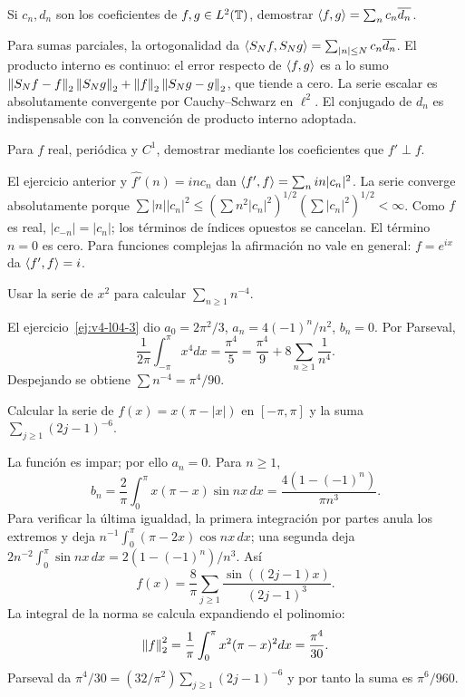 \begin{ejercicio}\label{ej:v4-l06-2}
Si $c_n,d_n$ son los coeficientes de $f,g\in L^2(\mathbb T)$, demostrar $\left\langle f,g\right\rangle=\sum_n c_n\overline{d_n}$.
\end{ejercicio}
\begin{solucion}
Para sumas parciales, la ortogonalidad da $\left\langle S_Nf,S_Ng\right\rangle=\sum_{|n|\leq N}c_n\overline{d_n}$. El producto interno es continuo: el error respecto de $\left\langle f,g\right\rangle$ es a lo sumo $\left\lVert S_Nf-f\right\rVert_2\left\lVert S_Ng\right\rVert_2+\left\lVert f\right\rVert_2\left\lVert S_Ng-g\right\rVert_2$, que tiende a cero. La serie escalar es absolutamente convergente por Cauchy--Schwarz en $\ell^2$. El conjugado de $d_n$ es indispensable con la convención de producto interno adoptada.
\end{solucion}

\begin{ejercicio}\label{ej:v4-l06-3}
Para $f$ real, periódica y $C^1$, demostrar mediante los coeficientes que $f'\perp f$.
\end{ejercicio}
\begin{solucion}
El ejercicio anterior y $\widehat{f'}(n)=inc_n$ dan $\left\langle f',f\right\rangle=\sum_n in|c_n|^2$. La serie converge absolutamente porque $\sum|n||c_n|^2\leq(\sum n^2|c_n|^2)^{1/2}(\sum|c_n|^2)^{1/2}<\infty$. Como $f$ es real, $|c_{-n}|=|c_n|$; los términos de índices opuestos se cancelan. El término $n=0$ es cero. Para funciones complejas la afirmación no vale en general: $f=e^{ix}$ da $\left\langle f',f\right\rangle=i$.
\end{solucion}

\begin{ejercicio}\label{ej:v4-l06-4}
Usar la serie de $x^2$ para calcular $\sum_{n\geq1}n^{-4}$.
\end{ejercicio}
\begin{solucion}
El ejercicio~\ref{ej:v4-l04-3} dio $a_0=2\pi^2/3$, $a_n=4(-1)^n/n^2$, $b_n=0$. Por Parseval,
\[
 \frac1{2\pi}\int_{-\pi}^\pi x^4dx
 =\frac{\pi^4}5=\frac{\pi^4}9+8\sum_{n\geq1}\frac1{n^4}.
\]
Despejando se obtiene $\sum n^{-4}=\pi^4/90$.
\end{solucion}

\begin{ejercicio}\label{ej:v4-l06-5}
Calcular la serie de $f(x)=x(\pi-|x|)$ en $[-\pi,\pi]$ y la suma $\sum_{j\geq1}(2j-1)^{-6}$.
\end{ejercicio}
\begin{solucion}
La función es impar; por ello $a_n=0$. Para $n\geq1$,
\[
 b_n=\frac2\pi\int_0^\pi x(\pi-x)\sin nx\,dx
 =\frac{4(1-(-1)^n)}{\pi n^3}.
\]
Para verificar la última igualdad, la primera integración por partes anula los extremos y deja $n^{-1}\int_0^\pi(\pi-2x)\cos nx\,dx$; una segunda deja $2n^{-2}\int_0^\pi\sin nx\,dx=2(1-(-1)^n)/n^3$. Así
\[
 f(x)=\frac8\pi\sum_{j\geq1}\frac{\sin((2j-1)x)}{(2j-1)^3}.
\]
La integral de la norma se calcula expandiendo el polinomio:
\[
 \left\lVert f\right\rVert_2^2=\frac1\pi\int_0^\pi x^2(\pi-x)^2dx=\frac{\pi^4}{30}.
\]
Parseval da $\pi^4/30=(32/\pi^2)\sum_{j\geq1}(2j-1)^{-6}$ y por tanto la suma es $\pi^6/960$.
\end{solucion}

